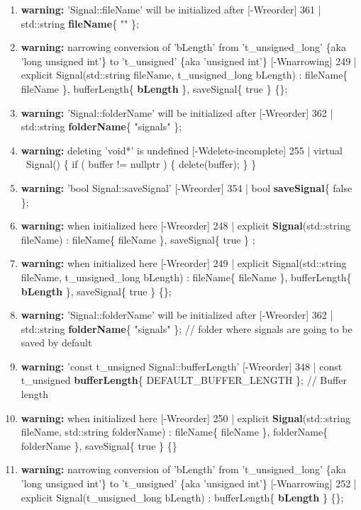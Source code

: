 \begin{enumerate}
	\item \textbf{warning:} 'Signal::fileName' will be initialized after [-Wreorder]
	361 |  std::string \textbf{fileName}\{ "" \};
	
	\item \textbf{warning:} narrowing conversion of 'bLength' from 't\_unsigned\_long' \{aka 'long unsigned int'\} to 't\_unsigned' \{aka 'unsigned int'\} [-Wnarrowing]
	249 |  explicit Signal(std::string fileName, t\_unsigned\_long bLength) : fileName\{ fileName \}, bufferLength\{ \textbf{bLength} \}, saveSignal\{ true \} \{\};
	
	\item \textbf{warning:} 'Signal::folderName' will be initialized after [-Wreorder]
	362 |  std::string \textbf{folderName}\{ "signals" \};
	
	\item \textbf{warning:} deleting 'void*' is undefined [-Wdelete-incomplete]
	255 |  virtual ~Signal() \{ if ( buffer != nullptr ) \{ delete(buffer); \} \}
	
	\item \textbf{warning:}	'bool Signal::saveSignal' [-Wreorder]
	354 |  bool \textbf{saveSignal}\{ false \};
	
	\item \textbf{warning:} when initialized here [-Wreorder]
	248 |  explicit \textbf{Signal}(std::string fileName) : fileName\{ fileName \}, saveSignal\{ true \} {};
	
	\item \textbf{warning:} when initialized here [-Wreorder]
	249 |  explicit Signal(std::string fileName, t\_unsigned\_long bLength) : fileName\{ fileName \}, bufferLength\{ \textbf{bLength} \}, saveSignal\{ true \} \{\};
	
	\item \textbf{warning:} 'Signal::folderName' will be initialized after [-Wreorder]
	362 |  std::string \textbf{folderName}\{ "signals" \};        // folder where signals are going to be saved by default
	
	\item \textbf{warning:} 'const t\_unsigned Signal::bufferLength' [-Wreorder]
	348 |  const t\_unsigned \textbf{bufferLength}\{ DEFAULT\_BUFFER\_LENGTH \};  // Buffer length
	
	\item \textbf{warning:} when initialized here [-Wreorder]
	250 |  explicit \textbf{Signal}(std::string fileName, std::string folderName) : fileName\{ fileName \}, folderName\{ folderName \}, saveSignal\{ true \} \{\}
	
	\item \textbf{warning:} narrowing conversion of 'bLength' from 't\_unsigned\_long' \{aka 'long unsigned int'\} to 't\_unsigned' \{aka 'unsigned int'\} [-Wnarrowing]
	252 |  explicit Signal(t\_unsigned\_long bLength) : bufferLength\{ \textbf{bLength} \} \{\};
	
\end{enumerate}

